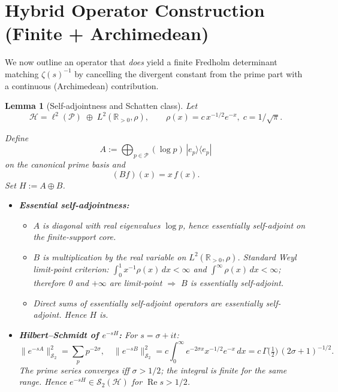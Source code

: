 \documentclass[11pt,a4paper]{article}
\newtheorem{lemma}[theorem]{Lemma}
\theoremstyle{definition}
\theoremstyle{remark}
\newcommand{\R}{\mathbb{R}}
\newcommand{\calP}{\mathcal{P}}
\newcommand{\calS}{\mathcal{S}}
\newcommand{\calH}{\mathcal{H}}
\DeclareMathOperator{\Re}{Re}
\begin{document}
\section{Hybrid Operator Construction (Finite + Archimedean)}\label{sec:hybrid}

We now outline an operator that \emph{does} yield a finite Fredholm determinant
matching $\zeta(s)^{-1}$ by cancelling the divergent constant from the prime part
with a continuous (Archimedean) contribution.

\begin{lemma}[Self-adjointness and Schatten class]\label{lem:hybrid-self}
Let  
\[
\calH = \ell^{2}(\calP)\;\oplus\;L^{2}(\R_{>0},\rho),\qquad\rho(x)=c\,x^{-1/2}e^{-x},\; c=1/\sqrt\pi .
\]

Define  
\[
A:=\bigoplus_{p\in\calP}(\log p)\,|e_p\rangle\langle e_p|
\]
on the canonical prime basis and  
\[
(Bf)(x)=x\,f(x).
\]
Set $H:=A\oplus B$.

\begin{itemize}
\item \textbf{Essential self-adjointness:}  
  \begin{itemize}
  \item $A$ is diagonal with real eigenvalues $\log p$, hence essentially self-adjoint on the finite-support core.  
  \item $B$ is multiplication by the real variable on $L^{2}(\R_{>0},\rho)$.  Standard Weyl limit-point criterion:  
     $\int_{0}^{1}x^{-1}\rho(x)\,dx<\infty$ and $\int^{\infty}\rho(x)\,dx<\infty$; therefore 0 and $+\infty$ are limit-point $\Rightarrow$ $B$ is essentially self-adjoint.  
  \item Direct sums of essentially self-adjoint operators are essentially self-adjoint.  Hence $H$ is.
  \end{itemize}

\item \textbf{Hilbert--Schmidt of $e^{-sH}$:}  
  For $s=\sigma+it$:
  \[
  \|e^{-sA}\|_{\calS_{2}}^{2}=\sum_{p}p^{-2\sigma},\quad
  \|e^{-sB}\|_{\calS_{2}}^{2}=c\!\int_{0}^{\infty} e^{-2\sigma x}x^{-1/2}e^{-x}\,dx
  =c\,\Gamma\!\bigl(\tfrac12\bigr)\,(2\sigma+1)^{-1/2}.
  \]
  The prime series converges iff $\sigma>1/2$; the integral is finite for the same range.  
  Hence $e^{-sH}\in\calS_2(\calH)$ for $\Re s>1/2$.
\end{itemize}
\end{lemma}
\end{document}
